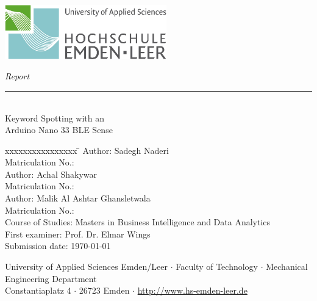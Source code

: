 %
%

\begin{titlepage}
    
    \begin{flushleft} 
        \includegraphics[width=7cm]{Images/General/HSEmdenLeerLogo.jpg}
    \end{flushleft} 
    
    \begin{flushright}
        \vspace{2cm}
        \LARGE \textsl{Report}\\
        \rule{0.6\textwidth}{0.4pt} ~\\
        \vspace{0.5cm}
        \textsf{\LARGE Keyword Spotting with an}\\
        \textsf{\LARGE Arduino Nano 33 BLE Sense}
    \end{flushright}
    
    \vspace{1.5cm}
    \large
    \begin{tabbing}
        xxxxxxxxxxxxxxxx \= \kill
        Author: \> Sadegh Naderi \\
		Matriculation No.:  \\ [0.5cm]
        Author: \> Achal Shakywar \\
        Matriculation No.:  \\ [0.5cm]
        Author: \> Malik Al Ashtar Ghansletwala \\
        Matriculation No.:  \\ [0.5cm]
        Course of Studies: \> Masters in Business Intelligence and Data Analytics \\ [0.5cm]
        First examiner: \> Prof. Dr. Elmar Wings \\
        Submission date: \> \today \\
    \end{tabbing}
    
    \vspace{1.5cm}
    \small
    \begin{center}
        University of Applied Sciences Emden/Leer $\cdot$ 
        Faculty of Technology $\cdot$ 
        Mechanical Engineering Department \\
        Constantiaplatz 4 $\cdot$ 
        26723 Emden $\cdot$ 
        \url{http://www.hs-emden-leer.de}
    \end{center}
    
\end{titlepage}
